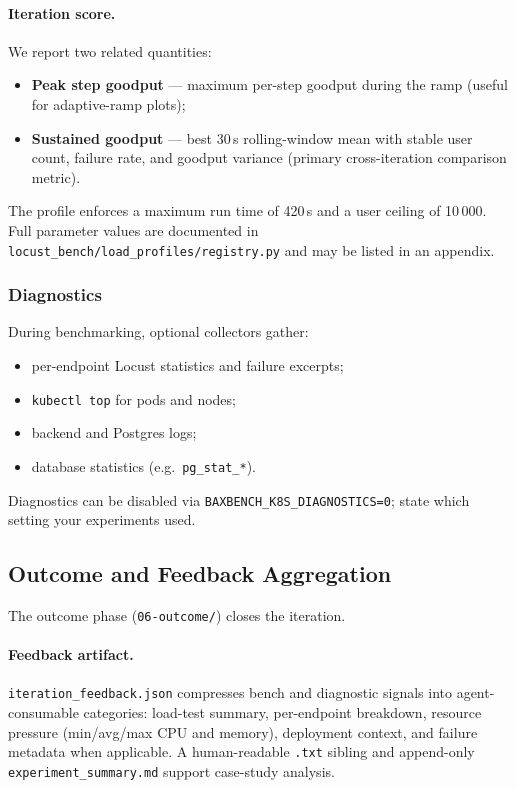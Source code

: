 \paragraph{Iteration score.}
We report two related quantities:
\begin{itemize}
  \item \textbf{Peak step goodput} --- maximum per-step goodput during the
        ramp (useful for adaptive-ramp plots);
  \item \textbf{Sustained goodput} --- best 30\,s rolling-window mean with
        stable user count, failure rate, and goodput variance (primary
        cross-iteration comparison metric).
\end{itemize}
The profile enforces a maximum run time of 420\,s and a user ceiling of
10\,000.  Full parameter values are documented in
\texttt{locust\_bench/load\_profiles/registry.py} and may be listed in an
appendix.

\subsubsection{Diagnostics}

During benchmarking, optional collectors gather:
\begin{itemize}
  \item per-endpoint Locust statistics and failure excerpts;
  \item \texttt{kubectl top} for pods and nodes;
  \item backend and Postgres logs;
  \item database statistics (e.g.\ \texttt{pg\_stat\_*}).
\end{itemize}
Diagnostics can be disabled via \texttt{BAXBENCH\_K8S\_DIAGNOSTICS=0}; state
which setting your experiments used.


\subsection{Outcome and Feedback Aggregation}
\label{sec:methods-outcome}

The outcome phase (\texttt{06-outcome/}) closes the iteration.

\paragraph{Feedback artifact.}
\texttt{iteration\_feedback.json} compresses bench and diagnostic signals into
agent-consumable categories: load-test summary, per-endpoint breakdown,
resource pressure (min/avg/max CPU and memory), deployment context, and
failure metadata when applicable.  A human-readable \texttt{.txt} sibling and
append-only \texttt{experiment\_summary.md} support case-study analysis.

